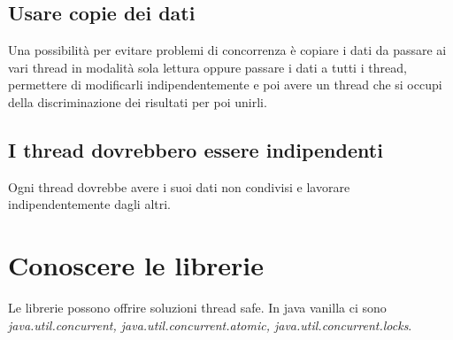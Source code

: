\documentclass[11pt,a4paper]{book}
\begin{document}
\subsection{Usare copie dei dati}
Una possibilità per evitare problemi di concorrenza è copiare i dati da passare ai vari thread in modalità sola lettura oppure passare i dati a tutti i thread, permettere di modificarli indipendentemente e poi avere un thread che si occupi della discriminazione dei risultati per poi unirli.

\subsection{I thread dovrebbero essere indipendenti}
Ogni thread dovrebbe avere i suoi dati non condivisi e lavorare indipendentemente dagli altri.

\section{Conoscere le librerie}
Le librerie possono offrire soluzioni thread safe. In java vanilla ci sono \emph{java.util.concurrent, java.util.concurrent.atomic, java.util.concurrent.locks}.
\end{document}
